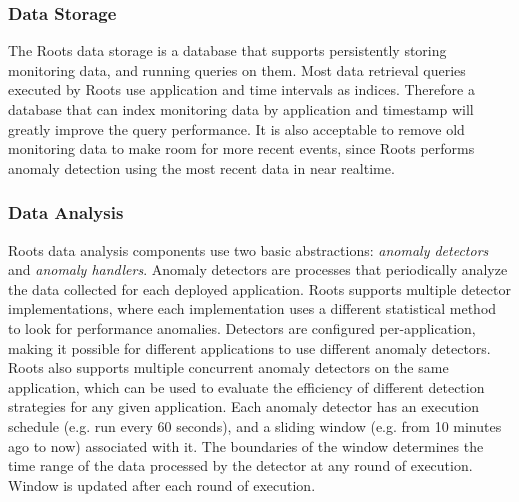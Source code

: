 \subsubsection{Data Storage}

The Roots data storage is a database that supports persistently storing monitoring data, and running
queries on them.  
Most data retrieval queries executed
by Roots use application and time intervals as indices. Therefore a database that can index monitoring
data by application and timestamp will greatly improve the query performance.
It is also acceptable to remove old monitoring data to make room for more recent events, since Roots
performs anomaly detection using the most recent data in near realtime.

\subsubsection{Data Analysis}

Roots data analysis components use two basic abstractions: \textit{anomaly detectors} 
and \textit{anomaly handlers}.
Anomaly detectors are processes that periodically analyze the data collected for
each deployed application. Roots supports multiple detector implementations, where each implementation
uses a different statistical method to look for performance anomalies. Detectors are configured
per-application, making it possible for different applications to use different anomaly 
detectors. Roots also supports multiple concurrent anomaly detectors on the same application, which can be used
to evaluate the efficiency of different detection strategies for any given application. Each
anomaly detector has an execution schedule (e.g. run every 60 seconds), and a sliding window 
(e.g. from 10 minutes ago to now)
associated with it. The boundaries of the window determines the time range
of the data processed by the detector at any round of execution. Window is updated 
after each round of execution. 

